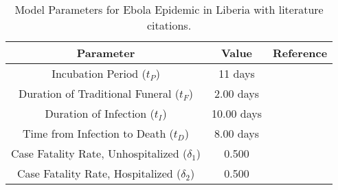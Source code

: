 \begin{table}[ht]
\centering %
\begin{tabular}{c c c}
\hline\hline %
Parameter & Value  & Reference \\ [0.5ex]
\hline %
Incubation Period (${t_{P}}$) & 11 days & \cite{WHOFacts} \\
Duration of Traditional Funeral (${t_{F}}$) & 2.00 days & \cite{Rivers2014} \\
Duration of Infection (${t_{I}}$) & 10.00 days & \cite{Rivers2014} \\
Time from Infection to Death (${t_{D}}$) & 8.00 days & \cite{Rivers2014} \\
Case Fatality Rate, Unhospitalized ($\delta_{1}$) & 0.500 & \cite{WHOFacts} \\
Case Fatality Rate, Hospitalized ($\delta_{2}$) & 0.500 & \cite{WHOFacts} \\ [1ex]
\hline
\end{tabular}
\label{tab:knownParameters}
\caption{Model Parameters for Ebola Epidemic in Liberia with literature citations.} %
\end{table}